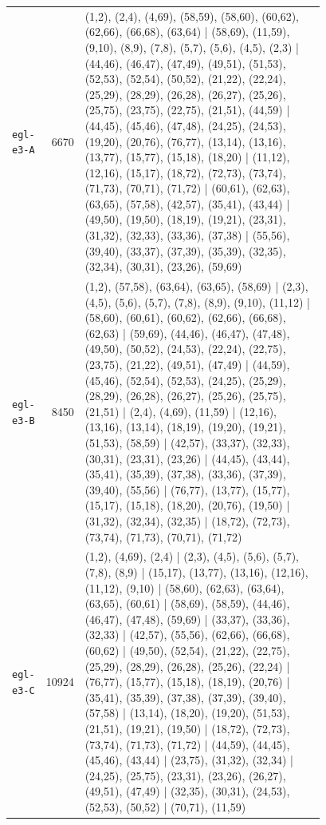 \begin{landscape}
\begin{longtable}{lr>{\tiny\raggedright\arraybackslash}p{0.78\linewidth}}
\texttt{egl-e3-A} & 6670 & (1,2), (2,4), (4,69), (58,59), (58,60), (60,62), (62,66), (66,68), (63,64) | (58,69), (11,59), (9,10), (8,9), (7,8), (5,7), (5,6), (4,5), (2,3) | (44,46), (46,47), (47,49), (49,51), (51,53), (52,53), (52,54), (50,52), (21,22), (22,24), (25,29), (28,29), (26,28), (26,27), (25,26), (25,75), (23,75), (22,75), (21,51), (44,59) | (44,45), (45,46), (47,48), (24,25), (24,53), (19,20), (20,76), (76,77), (13,14), (13,16), (13,77), (15,77), (15,18), (18,20) | (11,12), (12,16), (15,17), (18,72), (72,73), (73,74), (71,73), (70,71), (71,72) | (60,61), (62,63), (63,65), (57,58), (42,57), (35,41), (43,44) | (49,50), (19,50), (18,19), (19,21), (23,31), (31,32), (32,33), (33,36), (37,38) | (55,56), (39,40), (33,37), (37,39), (35,39), (32,35), (32,34), (30,31), (23,26), (59,69) \\[2pt]
\texttt{egl-e3-B} & 8450 & (1,2), (57,58), (63,64), (63,65), (58,69) | (2,3), (4,5), (5,6), (5,7), (7,8), (8,9), (9,10), (11,12) | (58,60), (60,61), (60,62), (62,66), (66,68), (62,63) | (59,69), (44,46), (46,47), (47,48), (49,50), (50,52), (24,53), (22,24), (22,75), (23,75), (21,22), (49,51), (47,49) | (44,59), (45,46), (52,54), (52,53), (24,25), (25,29), (28,29), (26,28), (26,27), (25,26), (25,75), (21,51) | (2,4), (4,69), (11,59) | (12,16), (13,16), (13,14), (18,19), (19,20), (19,21), (51,53), (58,59) | (42,57), (33,37), (32,33), (30,31), (23,31), (23,26) | (44,45), (43,44), (35,41), (35,39), (37,38), (33,36), (37,39), (39,40), (55,56) | (76,77), (13,77), (15,77), (15,17), (15,18), (18,20), (20,76), (19,50) | (31,32), (32,34), (32,35) | (18,72), (72,73), (73,74), (71,73), (70,71), (71,72) \\[2pt]
\texttt{egl-e3-C} & 10924 & (1,2), (4,69), (2,4) | (2,3), (4,5), (5,6), (5,7), (7,8), (8,9) | (15,17), (13,77), (13,16), (12,16), (11,12), (9,10) | (58,60), (62,63), (63,64), (63,65), (60,61) | (58,69), (58,59), (44,46), (46,47), (47,48), (59,69) | (33,37), (33,36), (32,33) | (42,57), (55,56), (62,66), (66,68), (60,62) | (49,50), (52,54), (21,22), (22,75), (25,29), (28,29), (26,28), (25,26), (22,24) | (76,77), (15,77), (15,18), (18,19), (20,76) | (35,41), (35,39), (37,38), (37,39), (39,40), (57,58) | (13,14), (18,20), (19,20), (51,53), (21,51), (19,21), (19,50) | (18,72), (72,73), (73,74), (71,73), (71,72) | (44,59), (44,45), (45,46), (43,44) | (23,75), (31,32), (32,34) | (24,25), (25,75), (23,31), (23,26), (26,27), (49,51), (47,49) | (32,35), (30,31), (24,53), (52,53), (50,52) | (70,71), (11,59) \\[2pt]

\end{longtable}
\end{landscape}
